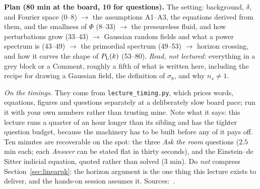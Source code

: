 \documentclass[a4paper,11pt]{article}
\def\Plin{P_{\rm L}}
\numberwithin{equation}{section}
\newenvironment{plan}{\par\noindent}{\par}
\begin{document}
\begin{plan}
\noindent\textbf{Plan (80 min at the board, 10 for questions).} The setting:
background, $\delta$, and Fourier space (0--8) $\rightarrow$ the assumptions
A1--A3, the equations derived from them, and the smallness of $\Phi$ (8--33)
$\rightarrow$ the pressureless fluid, and how perturbations grow (33--43)
$\rightarrow$ Gaussian random fields and what a power spectrum is (43--49)
$\rightarrow$ the primordial spectrum (49--53) $\rightarrow$ horizon crossing,
and how it carves the shape of $\Plin(k)$ (53--80). \emph{Read, not lectured:} everything in a grey block or a Comment, roughly a fifth of what is written here, including the recipe
for drawing a Gaussian field, the definition of $\sigma_8$, and why
$n_s \neq 1$.

\emph{On the timings.} They come from \texttt{lecture\_timing.py}, which prices
words, equations, figures and questions separately at a deliberately slow board
pace; run it with your own numbers rather than trusting mine. Note what it says:
this lecture runs a quarter of an hour longer than its sibling and has the tighter
question budget, because the machinery has to be built before any of it pays
off. Ten minutes are recoverable on the spot: the three \emph{Ask the room}
questions ($2.5$ min each; each \emph{Answer} can be stated flat in thirty
seconds), and the Einstein--de Sitter indicial equation, quoted rather than
solved ($3$ min). Do \emph{not} compress
Section~\ref{sec:linearpk}: the horizon argument is the one thing this lecture
exists to deliver, and the hands-on session assumes it.
Sources:~\cite{MaBertschinger1995,DodelsonSchmidt}.
\end{plan}
\end{document}
